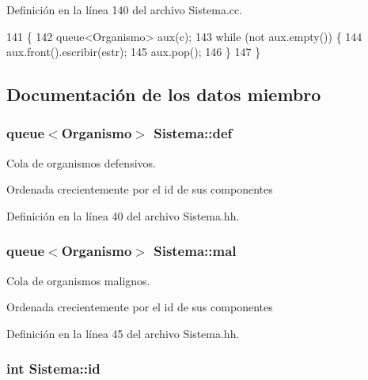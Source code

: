 Definición en la línea 140 del archivo Sistema.\+cc.


\begin{DoxyCode}
141 \{
142   queue<Organismo> aux(c);
143   \textcolor{keywordflow}{while} (not aux.empty()) \{
144     aux.front().escribir(estr);
145     aux.pop();
146   \}
147 \}
\end{DoxyCode}


\subsection{Documentación de los datos miembro}
\hypertarget{class_sistema_a7311a56f7b8336096ca52a744c4d3804}{
\subsubsection[{def}]{\setlength{\rightskip}{0pt plus 5cm}queue$<${\bf Organismo}$>$ Sistema\+::def\hspace{0.3cm}{\ttfamily [private]}}}\label{class_sistema_a7311a56f7b8336096ca52a744c4d3804}


Cola de organismos defensivos. 

Ordenada crecientemente por el id de sus componentes 

Definición en la línea 40 del archivo Sistema.\+hh.

\hypertarget{class_sistema_a11fa1af3dde26025dd10b3ac103f426e}{
\subsubsection[{mal}]{\setlength{\rightskip}{0pt plus 5cm}queue$<${\bf Organismo}$>$ Sistema\+::mal\hspace{0.3cm}{\ttfamily [private]}}}\label{class_sistema_a11fa1af3dde26025dd10b3ac103f426e}


Cola de organismos malignos. 

Ordenada crecientemente por el id de sus componentes 

Definición en la línea 45 del archivo Sistema.\+hh.

\hypertarget{class_sistema_a69ba5e2cce55afc2a47d899a1100a42a}{
\subsubsection[{id}]{\setlength{\rightskip}{0pt plus 5cm}int Sistema\+::id\hspace{0.3cm}{\ttfamily [private]}}}\label{class_sistema_a69ba5e2cce55afc2a47d899a1100a42a}


